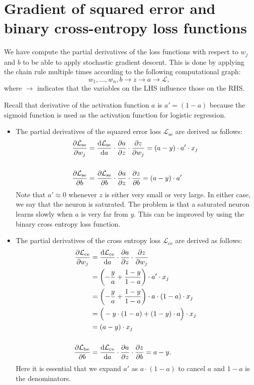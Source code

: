 \documentclass[12pt]{article}
\begin{document}
\section{Gradient of squared error and binary cross-entropy loss functions}

We have compute the partial derivatives of the loss functions with respect to $w_j$ and $b$ to be able to apply stochastic gradient descent. This is done by applying the chain rule multiple times according to the following computational graph: 
\begin{equation}
w_1,\ldots,w_n, b \rightarrow z \rightarrow a \rightarrow \mathcal{L},
\end{equation}
where $\rightarrow$ indicates that the variables on the LHS influence those on the RHS.

Recall that derivative of the activation function $a$ is $a' = (1-a)$ because the sigmoid function is used as the activation function for logistic regression.
\begin{itemize}
\item 
The partial derivatives of the squared error loss $\mathcal{L}_\mathrm{se}$ are derived as follows:
\begin{align}
{\partial \mathcal{L}_\mathrm{se} \over \partial w_j}
&=  
{\mathrm{d} \mathcal{L}_\mathrm{se} \over \mathrm{d}a} \cdot {\partial a \over \partial z} \cdot {\partial z \over \partial w_j} =
(a - y) \cdot a' \cdot x_j  \\
& \notag \\
%
{\partial \mathcal{L}_\mathrm{se} \over \partial b} 
&=
{\partial \mathcal{L}_\mathrm{se} \over \partial b} \cdot  {\partial a \over \partial z} \cdot {\partial z \over \partial b} =
(a - y) \cdot a'
\end{align}
Note that $a'\approx 0$ whenever $z$ is either very small or very large. In either case, we say that the neuron is saturated. The problem is that a saturated neuron learns slowly when $a$ is very far from $y$. This can be improved by using the binary cross entropy loss function.
\item
The partial derivatives of the cross entropy loss $\mathcal{L}_\mathrm{ce}$ are derived as follows:
\begin{align}
{\partial \mathcal{L}_\mathrm{ce} \over \partial w_j}
&=  
{\mathrm{d} \mathcal{L}_\mathrm{ce} \over \mathrm{d}a} \cdot {\partial a \over \partial z} \cdot {\partial z \over \partial w_j} \\
&= 
\left(-\frac{y}{a} + \frac{1-y}{1-a} \right) \cdot a' \cdot x_j  \\
&=
\left(-\frac{y}{a} + \frac{1-y}{1-a} \right) \cdot a \cdot (1 - a) \cdot x_j  \\
&=
\Big( - y \cdot  (1 - a) + (1-y) \cdot a \Big) \cdot x_j \\
&=
(a - y) \cdot x_j \\
%
& \notag \\
{\partial \mathcal{L}_\mathrm{be} \over \partial b} 
&=
{\mathrm{d} \mathcal{L}_\mathrm{ce} \over \mathrm{d}a} \cdot {\partial a \over \partial z} \cdot {\partial z \over \partial b} = 
a - y.
\end{align}
Here it is essential that we expand $a'$ as $a \cdot (1-a)$ to cancel $a$ and $1-a$ is the denominators.
\end{itemize}
\end{document}
